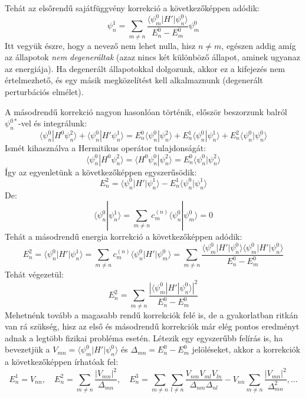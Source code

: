 \documentclass[../main.tex]{subfiles}
\begin{document}
Tehát az elsőrendű sajátfüggvény korrekció a következőképpen adódik:
\begin{equation}
    \boxed{\psi_n^1 = \sum_{m \neq n} \frac{\langle \psi_m^0 | H' | \psi_n^0 \rangle}{E_n^0 - E_m^0} \psi_m^0}
\end{equation}
Itt vegyük észre, hogy a nevező nem lehet nulla, hisz $n \neq m$, egészen addig amíg az állapotok \textit{nem degeneráltak} (azaz nincs két különböző állapot, aminek ugyanaz az energiája). Ha degenerált állapotokkal dolgozunk,
akkor ez a kifejezés nem értelmezhető, és egy másik megközelítést kell alkalmaznunk (degenerált perturbációs elmélet).

A másodrendű korrekció nagyon hasonlóan történik, először beszorzunk balról $\psi_n^{0*}$-vel és integrálunk:
\begin{equation}
    \langle \psi_n^0 | H^0 \psi_n^2 \rangle + \langle \psi_n^0 | H' \psi_n^1 \rangle = E_n^0 \langle \psi_n^0 | \psi_n^2 \rangle + E_n^1 \langle \psi_n^0 | \psi_n^1 \rangle + E_n^2 \langle \psi_n^0 | \psi_n^0 \rangle
\end{equation}
Ismét kihasználva a Hermitikus operátor tulajdonságát:
\begin{equation}
    \langle \psi_n^0 | H^0 \psi_n^2 \rangle = \langle H^0 \psi_n^0 | \psi_n^2 \rangle = E_n^0 \langle \psi_n^0 | \psi_n^2 \rangle
\end{equation}
Így az egyenletünk a következőképpen egyszerűsödik:
\begin{equation}
    E_n^2 = \langle \psi_n^0 | H' | \psi_n^1 \rangle - E_n^1 \langle \psi_n^0 | \psi_n^1 \rangle
\end{equation}
De:
\begin{equation}
    \langle \psi_n^0 | \psi_n^1 \rangle = \sum_{m \neq n} c_m^{(n)} \langle \psi_n^0 | \psi_m^0 \rangle = 0
\end{equation}
Tehát a másodrendű energia korrekció a következőképpen adódik:
\begin{equation}
    E_n^2 = \langle \psi_n^0 | H' | \psi_n^1 \rangle = \sum_{m \neq n} c_m^{(n)} \langle \psi_n^0 | H' | \psi_m^0 \rangle = \sum_{m \neq n} \frac{\langle \psi_m^0 | H' | \psi_n^0 \rangle \langle \psi_m^0 | H' | \psi_n^0 \rangle}{E_n^0 - E_m^0}
\end{equation}
Tehát végezetül:
\begin{equation}
    \boxed{E_n^2 = \sum_{m \neq n} \frac{|\langle \psi_m^0 | H' | \psi_n^0 \rangle|^2}{E_n^0 - E_m^0}}
\end{equation}
Mehetnénk tovább a magasabb rendű korrekciók felé is, de a gyakorlatban ritkán van rá szükség, hisz az első és másodrendű korrekciók már elég pontos eredményt adnak a legtöbb fizikai probléma esetén.
Létezik egy egyszerűbb felírás is, ha bevezetjük a $V_{mn} = \langle \psi_m^0 | H' | \psi_n^0 \rangle$ és $\Delta_{mn} = E_n^0 - E_m^0$ jelöléseket, akkor a korrekciók a következőképpen írhatóak fel:
\begin{equation}
    E_n^1 = V_{nn}, \quad E_n^2 = \sum_{m \neq n} \frac{|V_{mn}|^2}{\Delta_{mn}}, \quad E_n^3 = \sum_{m \neq n} \sum_{l \neq n} \frac{V_{nm} V_{ml} V_{ln}}{\Delta_{nm} \Delta_{nl}} - V_{nn} \sum_{m \neq n} \frac{|V_{mn}|^2}{\Delta_{mn}^2}, ...
\end{equation}
\end{document}
